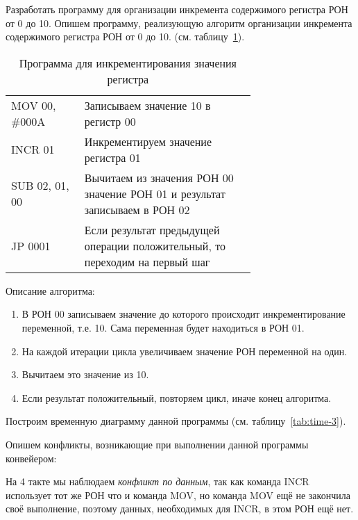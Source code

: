 \documentclass[a4paper,14pt]{extarticle}
\begin{document}
\begin{problem}
	Разработать программу для организации инкремента содержимого
	регистра РОН от 0 до 10.
	\nonum
	Опишем программу, реализующую алгоритм организации инкремента содержимого
	регистра РОН от 0 до 10. (см. таблицу~\ref{tab:prog-3}).	
	
	\begin{table}[htbp]
		\begin{tabular}{|l|p{0.7\linewidth}|}
			\hline
			\centerboldcell{Команда} & \centerboldcell{Описание} \\ \hline\hline
			MOV 00, \#000A & Записываем значение 10 в регистр 00 \\ \hline
			INCR 01 & Инкрементируем значение регистра 01 \\ \hline
			SUB 02, 01, 00 & Вычитаем из значения РОН 00 значение РОН 01 и результат записываем в РОН 02 \\ \hline
			JP 0001 & Если результат предыдущей операции положительный, то переходим на первый шаг \\ \hline
		\end{tabular}
		\caption{Программа для инкрементирования значения регистра}
		\label{tab:prog-3}
	\end{table}

Описание алгоритма:
\begin{enumerate}
	\item В РОН 00 записываем значение до которого происходит инкрементирование переменной, т.е. 10. Сама переменная будет находиться в РОН 01.
	\item На каждой итерации цикла увеличиваем значение РОН переменной на один.
	\item Вычитаем это значение из 10.
	\item Если результат положительный, повторяем цикл, иначе конец алгоритма.
\end{enumerate}

Построим временную диаграмму данной программы (см. таблицу~\ref{tab:time-3}).

Опишем конфликты, возникающие при выполнении данной программы конвейером:

На 4 такте мы наблюдаем \textit{конфликт по данным}, так как команда INCR использует тот же РОН что и команда MOV, но команда MOV ещё не закончила своё выполнение, поэтому данных, необходимых для INCR, в этом РОН ещё нет.

\end{problem}	
\end{document}
